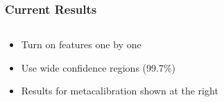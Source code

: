 \documentclass{beamer}
\begin{document}
\frame
{


    \frametitle{Current Results}


    \begin{columns}
        \begin{column}{0.5\textwidth}
        \begin{itemize}

            \item Turn on features one by one
            \item Use wide confidence regions (99.7\%)
            \item Results for metacalibration shown at the right

        \end{itemize}
        \end{column}
        \begin{column}{0.5\textwidth}
            \begin{center}
                \texttt{[image: \{mvals-fig.png]}}
            \end{center}
            
        \end{column}
    \end{columns}


}
\end{document}
